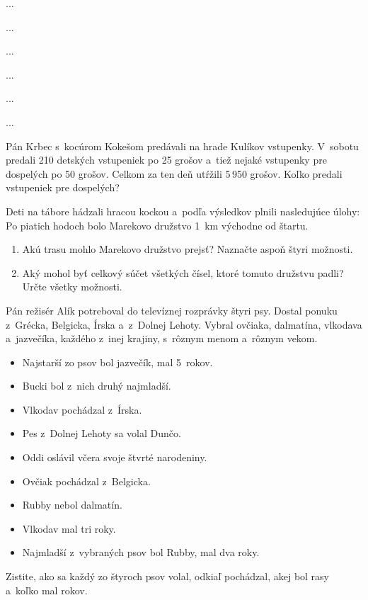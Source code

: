 ﻿{%
...}

{%
...}

{%
...}

{%
...}

{%
...}

{%
...}

{%
Pán Krbec s~kocúrom Kokešom predávali na hrade Kulíkov vstupenky.
V~sobotu predali 210 detských vstupeniek po 25 grošov a~tiež nejaké vstupenky pre dospelých po 50 grošov.
Celkom za ten deň utŕžili 5\,950 grošov.
Koľko predali vstupeniek pre dospelých?
}

{%
Deti na tábore hádzali hracou kockou a~podľa výsledkov plnili nasledujúce úlohy:
Po piatich hodoch bolo Marekovo družstvo 1~km východne od štartu.
\begin{enumerate}
\item Akú trasu mohlo Marekovo družstvo prejsť? Naznačte aspoň štyri možnosti.
\item Aký mohol byť celkový súčet všetkých čísel, ktoré tomuto družstvu padli? Určte všetky možnosti.
\end{enumerate}
}

{%
Pán režisér Alík potreboval do televíznej rozprávky štyri psy.
Dostal ponuku z~Grécka, Belgicka, Írska a~z~Dolnej Lehoty.
Vybral ovčiaka, dalmatína, vlkodava a~jazvečíka, každého z~inej krajiny, s~rôznym menom a~rôznym vekom.
\begin{itemize}
\item Najstarší zo psov bol jazvečík, mal 5~rokov.
\item Bucki bol z~nich druhý najmladší.
\item Vlkodav pochádzal z~Írska.
\item Pes z~Dolnej Lehoty sa volal Dunčo.
\item Oddi oslávil včera svoje štvrté narodeniny.
\item Ovčiak pochádzal z~Belgicka.
\item Rubby nebol dalmatín.
\item Vlkodav mal tri roky.
\item Najmladší z~vybraných psov bol Rubby, mal dva roky.
\end{itemize}
Zistite, ako sa každý zo štyroch psov volal, odkiaľ pochádzal, akej bol rasy a~koľko mal rokov.
}

